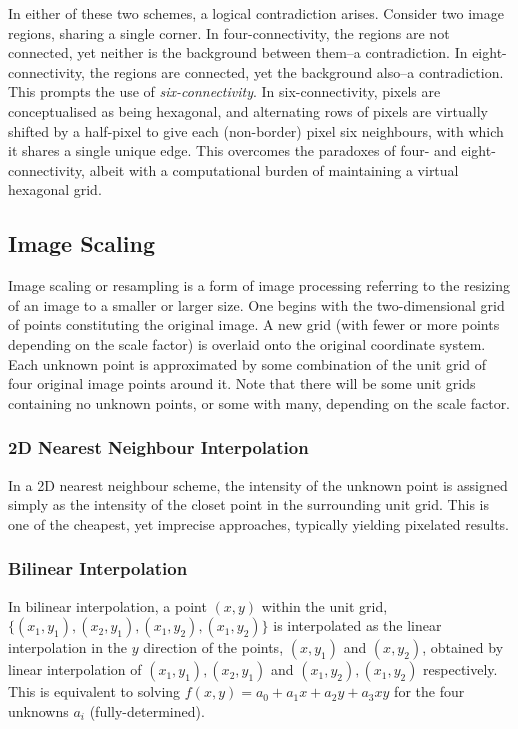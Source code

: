 \documentclass[11pt]{amsart}
\begin{document}
In either of these two schemes, a logical contradiction arises. Consider two image regions, sharing a single corner. In four-connectivity, the regions are not connected, yet neither is the background between them--a contradiction. In eight-connectivity, the regions are connected, yet the background also--a contradiction. This prompts the use of \emph{six-connectivity}. In six-connectivity, pixels are conceptualised as being hexagonal, and alternating rows of pixels are virtually shifted by a half-pixel to give each (non-border) pixel six neighbours, with which it shares a single unique edge. This overcomes the paradoxes of four- and eight-connectivity, albeit with a computational burden of maintaining a virtual hexagonal grid.

\subsection{Image Scaling}

Image scaling or resampling is a form of image processing referring to the resizing of an image to a smaller or larger size. One begins with the two-dimensional grid of points constituting the original image. A new grid (with fewer or more points depending on the scale factor) is overlaid onto the original coordinate system. Each unknown point is approximated by some combination of the unit grid of four original image points around it. Note that there will be some unit grids containing no unknown points, or some with many, depending on the scale factor.

\subsubsection{2D Nearest Neighbour Interpolation}

In a 2D nearest neighbour scheme, the intensity of the unknown point is assigned simply as the intensity of the closet point in the surrounding unit grid. This is one of the cheapest, yet imprecise approaches, typically yielding pixelated results.

\subsubsection{Bilinear Interpolation}

In bilinear interpolation, a point $(x, y)$ within the unit grid, $\{(x_1, y_1), (x_2, y_1), (x_1, y_2), (x_1, y_2)\}$ is interpolated as the linear interpolation in the $y$ direction of the points, $(x, y_1)$ and $(x, y_2)$, obtained by linear interpolation of $(x_1, y_1), (x_2, y_1)$ and $(x_1, y_2), (x_1, y_2)$ respectively. This is equivalent to solving $f(x, y) = a_0 + a_1x + a_2y + a_3xy$ for the four unknowns $a_i$ (fully-determined).
\end{document}
